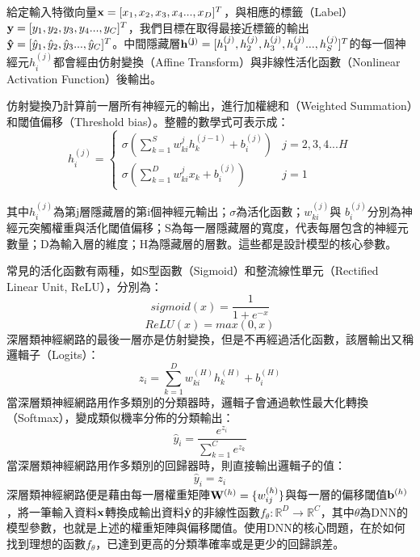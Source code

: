 給定輸入特徵向量$\bold{x} = [x_1 , x_2 , x_3 , x_4 ... , x_D]^T$，與相應的標籤（Label）$\bold{y} = [y_1 , y_2 , y_3 , y_4 ... ,y_C]^T$，我們目標在取得最接近標籤的輸出$\bold{\hat{y}} = [\hat{y}_1 , \hat{y}_2 , \hat{y}_3 ... , \hat{y}_C]^T$。中間隱藏層$\bold{h^{(j)}} = [h^{(j)}_1 , h^{(j)}_2 , h^{(j)}_3 , h^{(j)}_4 ... , h^{(j)}_S]^T$的每一個神經元$h^{(j)}_{i}$都會經由仿射變換（Affine Transform）與非線性活化函數（Nonlinear Activation Function）後輸出。

仿射變換乃計算前一層所有神經元的輸出，進行加權總和（Weighted Summation）和閾值偏移（Threshold bias）。整體的數學式可表示成：
\begin{equation}
h^{(j)}_{i} =
\left\{\begin{matrix}
 \sigma (\sum_{k=1}^{S} w_{ki}^{j}h_{k}^{(j-1)} + b_{i}^{(j)}) & j = 2 , 3 , 4 ... H \\ 
 \sigma (\sum_{k=1}^{D} w_{ki}^{j}x_{k} + b_{i}^{(j)}) & j = 1 
\end{matrix}\right.
\end{equation}

其中$h_i^{(j)}$為第j層隱藏層的第i個神經元輸出；$\sigma$為活化函數；$w_{ki}^{(j)}$與 $b_{i}^{(j)}$分別為神經元突觸權重與活化閾值偏移；S為每一層隱藏層的寬度，代表每層包含的神經元數量；D為輸入層的維度；H為隱藏層的層數。這些都是設計模型的核心參數。

常見的活化函數有兩種，如S型函數（Sigmoid）和整流線性單元（Rectified Linear Unit, ReLU），分別為：
\begin{equation}
sigmoid(x) = \frac{1}{1 + e^{-x}}
\end{equation}
\begin{equation}
ReLU(x) = max( 0 , x )
\end{equation}
深層類神經網路的最後一層亦是仿射變換，但是不再經過活化函數，該層輸出又稱邏輯子（Logits）：
\begin{equation}
z_i = \sum_{k=1}^{D} w_{ki}^{(H)}h_{k}^{(H)} + b_{i}^{(H)} 
\end{equation}
當深層類神經網路用作多類別的分類器時，邏輯子會通過軟性最大化轉換（Softmax），變成類似機率分佈的分類輸出：
\begin{equation}
\hat{y}_i = \frac{e^{z_i}}{\sum_{k=1}^{C}e^{z_k} }
\end{equation}
當深層類神經網路用作多類別的回歸器時，則直接輸出邏輯子的值：
\begin{equation}
\hat{y}_i = z_i 
\end{equation}
深層類神經網路便是藉由每一層權重矩陣$\bold{W}^{(h)} = \{w_{ij}^{(h)}\}$與每一層的偏移閾值$\bold{b}^{(h)}$，將一筆輸入資料$\bold{x}$轉換成輸出資料$\hat{\bold{y}}$的非線性函數$f_{\theta}:\mathbb{R}^D\rightarrow \mathbb{R}^C$，其中$\theta$為DNN的模型參數，也就是上述的權重矩陣與偏移閾值。使用DNN的核心問題，在於如何找到理想的函數$f_{\theta}$，已達到更高的分類準確率或是更少的回歸誤差。
